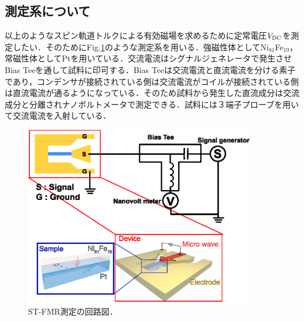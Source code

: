 \subsection{測定系について}

以上のようなスピン軌道トルクによる有効磁場を求めるために定常電圧$V_{\rm DC}$を測定したい．そのためにFig.\ref{fig:ST-FMR_system}のような測定系を用いる．強磁性体としてNi$_{81}$Fe$_{19}$，常磁性体としてPtを用いている．交流電流はシグナルジェネレータで発生させBias Teeを通して試料に印可する．Bias Teeは交流電流と直流電流を分ける素子であり，コンデンサが接続されている側は交流電流がコイルが接続されている側は直流電流が通るようになっている．そのため試料から発生した直流成分は交流成分と分離されナノボルトメータで測定できる．試料には３端子プローブを用いて交流電流を入射している．
\begin{figure}[t]
 \begin{center}
  \includegraphics[width=100mm]{images/ST-FMR_system.eps}
  \end{center}
   \caption{ST-FMR測定の回路図．}
 \label{fig:ST-FMR_system}
\end{figure}














